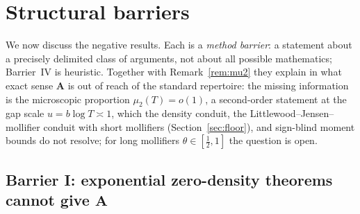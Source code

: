\documentclass[11pt]{amsart}
\theoremstyle{plain}
\theoremstyle{definition}
\theoremstyle{remark}
\newcommand{\Aax}{\mathbf{A}}
\begin{document}
\section{Structural barriers}\label{sec:barriers}

We now discuss the negative results. Each is a \emph{method barrier}: a statement about a precisely delimited class of arguments, not about all possible mathematics; Barrier~IV is heuristic. Together with Remark~\ref{rem:mu2} they explain in what exact sense $\Aax$ is out of reach of the standard repertoire: the missing information is the microscopic proportion $\mu_2(T)=o(1)$, a second-order statement at the gap scale $u=b\log T\asymp1$, which the density conduit, the Littlewood--Jensen--mollifier conduit with short mollifiers (Section~\ref{sec:floor}), and sign-blind moment bounds do not resolve; for long mollifiers $\theta\in[\tfrac12,1]$ the question is open.

\subsection{Barrier I: exponential zero-density theorems cannot give $\Aax$}
\end{document}
